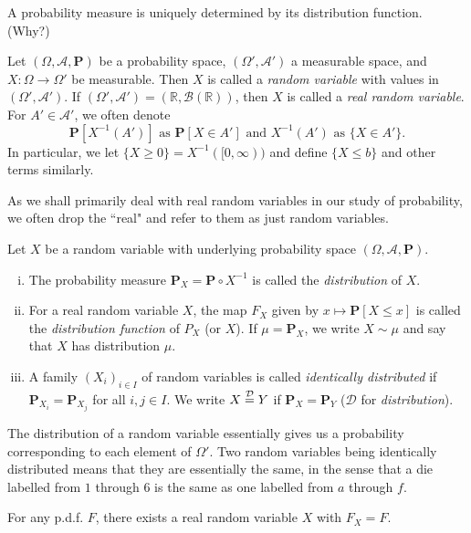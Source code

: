 A probability measure is uniquely determined by its distribution function. (Why?)

\begin{fdef}
    Let $(\Omega,\mathcal{A},\textbf{P})$ be a probability space, $(\Omega',\mathcal{A}')$ a measurable space, and $X:\Omega\to\Omega'$ be measurable. Then $X$ is called a \textit{random variable} with values in $(\Omega',\mathcal{A}')$. If $(\Omega',\mathcal{A}') = (\mathbb{R},\mathcal{B}(\mathbb{R}))$, then $X$ is called a \textit{real random variable}. For $A'\in\mathcal{A}'$, we often denote
        $$\textbf{P}[X^{-1}(A')]\text{ as }\textbf{P}[X\in A']\text{ and } X^{-1}(A')\text{ as }\{X\in A'\}.$$
    In particular, we let $\{X\geq 0\}=X^{-1}([0,\infty))$ and define $\{X\leq b\}$ and other terms similarly.
\end{fdef}


As we shall primarily deal with real random variables in our study of probability, we often drop the ``real" and refer to them as just random variables.

\begin{definition}
    Let $X$ be a random variable with underlying probability space $(\Omega,\mathcal{A},\textbf{P})$.
    \begin{enumerate}[(i)]
        \item The probability measure $\textbf{P}_X=\textbf{P}\circ X^{-1}$ is called the \textit{distribution} of $X$.
        \item For a real random variable $X$, the map $F_X$ given by $x\mapsto\textbf{P}[X\leq x]$ is called the \textit{distribution function} of $P_X$ (or $X$). If $\mu=\textbf{P}_X$, we write $X\sim\mu$ and say that $X$ has distribution $\mu$.
        \item A family $(X_i)_{i\in I}$ of random variables is called \textit{identically distributed} if $\textbf{P}_{X_i}=\textbf{P}_{X_j}$ for all $i,j\in I$. We write $X\stackrel{\mathcal{D}}{=} Y$ if $\textbf{P}_X=\textbf{P}_Y$ ($\mathcal{D}$ for \textit{distribution}).
    \end{enumerate}
\end{definition}

The distribution of a random variable essentially gives us a probability corresponding to each element of $\Omega'$. Two random variables being identically distributed means that they are essentially the same, in the sense that a die labelled from $1$ through $6$ is the same as one labelled from $a$ through $f$.

\begin{theorem}
    For any p.d.f. $F$, there exists a real random variable $X$ with $F_X=F$.
\end{theorem}

